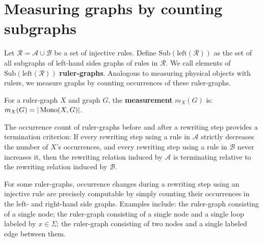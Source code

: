 
\section{Measuring graphs by counting subgraphs}
\label{sec:interpretation}
Let $\mathcal{R} = \mathcal{A} \cup \mathcal{B}$ be a set of injective rules.
Define $\mathrm{Sub}(\mathrm{left}(\mathcal{R}))$ as the set of all subgraphs of left-hand sides graphs of rules in $\mathcal{R}$.
We call elements of $\mathrm{Sub}(\mathrm{left}(\mathcal{R}))$ \textbf{ruler-graphs}. Analogous to measuring physical objects with rulers, we measure graphs by counting occurrences of these ruler-graphs.

\begin{definition}
    For a ruler-graph \( X \) and graph \( G \), the \textbf{measurement} \( m_X(G) \) is:
    \(
        m_X(G) = |\operatorname{Mono}(X, G)|
    \).
\end{definition} 
The occurrence count of ruler-graphs before and after a rewriting step provides a termination criterion: 
    If every rewriting step using a rule in $\mathcal{A}$ strictly decreases the number of $X$'s occurrences, and every rewriting step using a rule in $\mathcal{B}$ never increases it, then the rewriting relation induced by $\mathcal{A}$ is terminating relative to the rewriting relation induced by $\mathcal{B}$.
 
For some ruler-graphs, occurrence changes during a rewriting step using an injective rule are precisely computable by simply counting their occurrences in the left- and right-hand side graphs. Examples include: the ruler-graph  consisting of a single node; the ruler-graph  consisting of a single node and a single loop labeled by $x\in \Sigma$; the ruler-graph  consisting of two nodes and a single labeled edge between them.  
    
